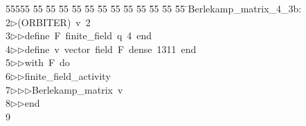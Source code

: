 %
%
\begin{tabbing}
55555 \= 55 \= 55 \= 55 \= 55 \= 55 \= 55 \= 55 \= 55 \= 55 \= 55 \= 55 \= 55 \= \>Berlekamp\_matrix\_4\_3b:\\[0pt]
2\>$\triangleright$\>(ORBITER)\ v\ 2\ \\[0pt]
3\>$\triangleright$\>$\triangleright$\>define\ F\ finite\_field\ q\ 4\ end\ \\[0pt]
4\>$\triangleright$\>$\triangleright$\>define\ v\ vector\ field\ F\ dense\ 1311\ end\ \\[0pt]
5\>$\triangleright$\>$\triangleright$\>with\ F\ do\ \\[0pt]
6\>$\triangleright$\>$\triangleright$\>finite\_field\_activity\ \\[0pt]
7\>$\triangleright$\>$\triangleright$\>$\triangleright$\>Berlekamp\_matrix\ v\ \\[0pt]
8\>$\triangleright$\>$\triangleright$\>end\\[0pt]
9\>\end{tabbing}
